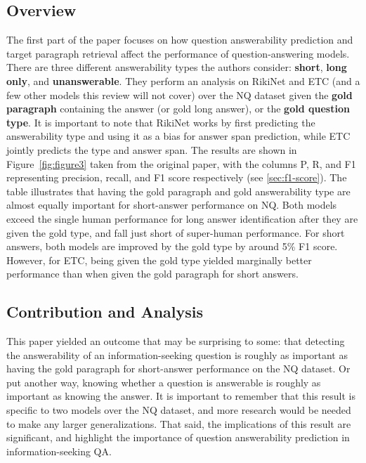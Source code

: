 \documentclass[letterpaper, 11pt]{article}
\begin{document}
\subsection{Overview}
The first part of the paper focuses on how question answerability prediction and target paragraph retrieval affect the performance of question-answering models. There are three different answerability types the authors consider: \textbf{short}, \textbf{long only}, and \textbf{unanswerable}. They perform an analysis
on RikiNet and ETC (and a few other models this review will not cover) over the NQ dataset given the \textbf{gold paragraph} containing the answer (or gold long answer), or the \textbf{gold question type}. It is important to note that RikiNet works by first predicting the answerability type and using it as a bias for answer span prediction, while
ETC jointly predicts the type and answer span. The results are shown in Figure~\ref{fig:figure3} taken from the original paper, with the columns P, R, and F1 representing precision, recall, and F1 score respectively (see \ref{sec:f1-score}).
The table illustrates that having the gold paragraph and gold answerability type are almost equally important for short-answer performance on NQ. Both models exceed the single human performance for long answer identification after they are given the gold type, and fall just short of super-human performance. For short answers, both models are improved by the gold type by around 5\% F1 score.
However, for ETC, being given the gold type yielded marginally better performance than when given the gold paragraph for short answers.

\subsection{Contribution and Analysis}
This paper yielded an outcome that may be surprising to some: that detecting the answerability of an information-seeking question is roughly as important as having the gold paragraph for short-answer performance on the NQ dataset. Or put another way, knowing whether a question is answerable is roughly as important as knowing the answer. 
It is important to remember that this result is specific to two models over the NQ dataset, and more research would be needed to make any larger generalizations. That said, the implications of this result are significant, and highlight the importance of question answerability prediction in information-seeking QA.
\end{document}
